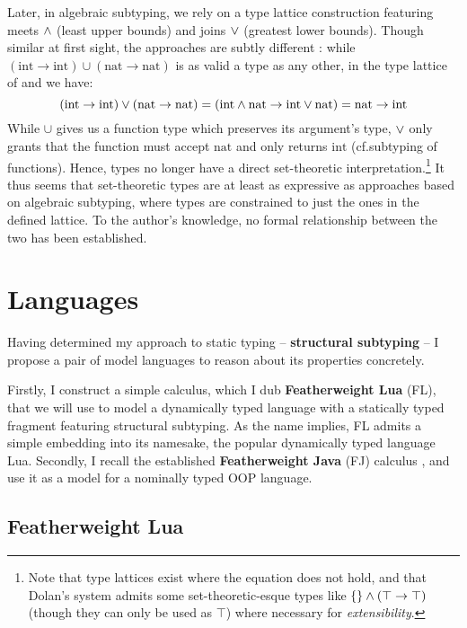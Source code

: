 Later, in algebraic subtyping, we rely on a type lattice construction featuring meets $\land$ (least upper bounds) and joins $\lor$ (greatest lower bounds). Though similar at first sight, the approaches are subtly different \cite{mlstruct}: while $(\mathrm{int} \to \mathrm{int}) \cup (\mathrm{nat} \to \mathrm{nat})$ is as valid a type as any other, in the type lattice of \mlsub{} \cite{mlsub} and \mlstruct{} \cite{mlstruct} we have: $$(\mathrm{int} \to \mathrm{int}) \lor (\mathrm{nat} \to \mathrm{nat}) = (\mathrm{int} \land \mathrm{nat} \to \mathrm{int} \lor \mathrm{nat}) = \mathrm{nat} \to \mathrm{int} $$
While $\cup$ gives us a function type which preserves its argument's type, $\lor$ only grants that the function must accept $\mathrm{nat}$ and only returns $\mathrm{int}$ (cf.\@ subtyping of functions).
Hence, types no longer have a direct set-theoretic interpretation.\footnote{Note that type lattices exist where the equation does not hold, and that Dolan's system admits some set-theoretic-esque types like $\{\} \land (\top \to \top)$ (though they can only be used as $\top$) where necessary for \emph{extensibility}.} It thus seems that set-theoretic types are at least as expressive as approaches based on algebraic subtyping, where types are constrained to just the ones in the defined lattice. To the author's knowledge, no formal relationship between the two has been established.

\section{Languages}
\label{sec:languages}

Having determined my approach to static typing -- \textbf{structural subtyping} -- I propose a pair of model languages to reason about its properties concretely.

Firstly, I construct a simple calculus, which I dub \textbf{Featherweight Lua} (FL), that we will use to model a dynamically typed language with a statically typed fragment featuring structural subtyping. As the name implies, FL admits a simple embedding into its namesake, the popular dynamically typed language Lua. Secondly, I recall the established \textbf{Featherweight Java} (FJ) calculus \cite{featherweight-java}, and use it as a model for a nominally typed OOP language.  

\subsection{Featherweight Lua}
\label{subsec:featherweight-lua}


